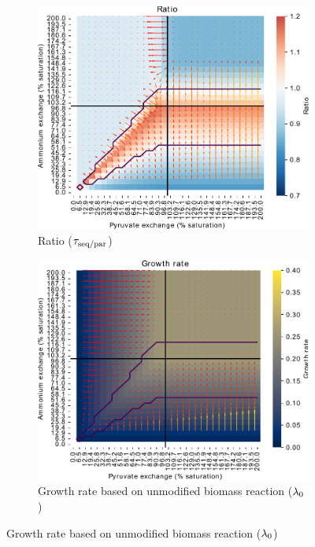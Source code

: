 \begin{figure}
  \centering
  \begin{subfigure}[t]{0.45\textwidth}
  \centering
    \includegraphics[width=\linewidth]{ec_grid_pyr_amm_ratio}
    \caption{
      Ratio ($\tau_{\mathrm{seq}/\mathrm{par}}$)
    }
    \label{fig:model-grid-pyr-ratio}
  \end{subfigure}%
  \begin{subfigure}[t]{0.45\textwidth}
  \centering
    \includegraphics[width=\linewidth]{ec_grid_pyr_amm_gr}
    \caption{
      Growth rate based on unmodified biomass reaction ($\lambda_{0}$)
    }
    \label{fig:model-grid-pyr-growthrate}
  \end{subfigure}


\end{figure}
